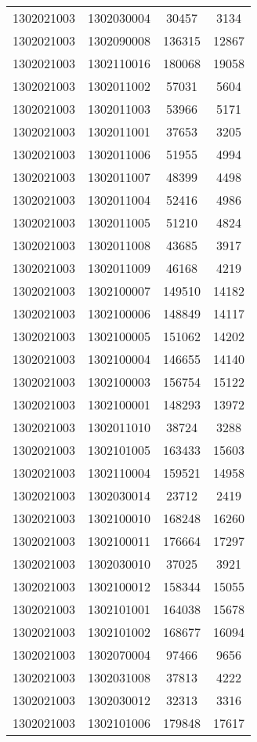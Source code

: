 \begin{longtable}{llcc}
1302021003 & 1302030004 & 30457 & 3134\\
1302021003 & 1302090008 & 136315 & 12867\\
1302021003 & 1302110016 & 180068 & 19058\\
1302021003 & 1302011002 & 57031 & 5604\\
1302021003 & 1302011003 & 53966 & 5171\\
1302021003 & 1302011001 & 37653 & 3205\\
1302021003 & 1302011006 & 51955 & 4994\\
1302021003 & 1302011007 & 48399 & 4498\\
1302021003 & 1302011004 & 52416 & 4986\\
1302021003 & 1302011005 & 51210 & 4824\\
1302021003 & 1302011008 & 43685 & 3917\\
1302021003 & 1302011009 & 46168 & 4219\\
1302021003 & 1302100007 & 149510 & 14182\\
1302021003 & 1302100006 & 148849 & 14117\\
1302021003 & 1302100005 & 151062 & 14202\\
1302021003 & 1302100004 & 146655 & 14140\\
1302021003 & 1302100003 & 156754 & 15122\\
1302021003 & 1302100001 & 148293 & 13972\\
1302021003 & 1302011010 & 38724 & 3288\\
1302021003 & 1302101005 & 163433 & 15603\\
1302021003 & 1302110004 & 159521 & 14958\\
1302021003 & 1302030014 & 23712 & 2419\\
1302021003 & 1302100010 & 168248 & 16260\\
1302021003 & 1302100011 & 176664 & 17297\\
1302021003 & 1302030010 & 37025 & 3921\\
1302021003 & 1302100012 & 158344 & 15055\\
1302021003 & 1302101001 & 164038 & 15678\\
1302021003 & 1302101002 & 168677 & 16094\\
1302021003 & 1302070004 & 97466 & 9656\\
1302021003 & 1302031008 & 37813 & 4222\\
1302021003 & 1302030012 & 32313 & 3316\\
1302021003 & 1302101006 & 179848 & 17617\\

\end{longtable}
